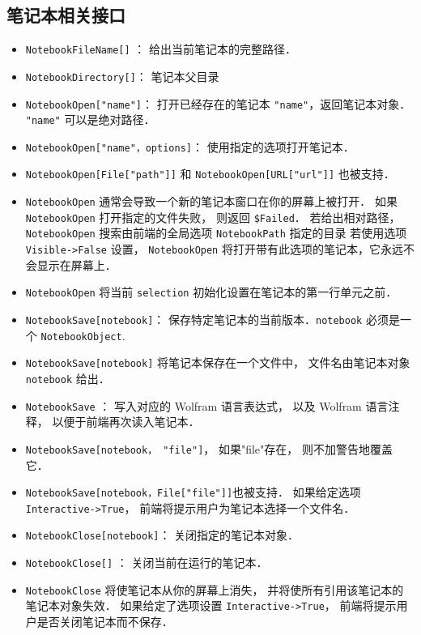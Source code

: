 \subsection{笔记本相关接口}

\begin{itemize}
\item \verb`NotebookFileName[]` ： 给出当前笔记本的完整路径．
\item \verb`NotebookDirectory[]`： 笔记本父目录
\end{itemize}


\begin{itemize}
\item \verb`NotebookOpen["name"]`：  打开已经存在的笔记本 \verb`"name"`，返回笔记本对象． \verb`"name"` 可以是绝对路径．
\item \verb`NotebookOpen["name"，options]`： 使用指定的选项打开笔记本．
\item \verb`NotebookOpen[File["path"]]` 和 \verb`NotebookOpen[URL["url"]]` 也被支持．
\item \verb`NotebookOpen` 通常会导致一个新的笔记本窗口在你的屏幕上被打开．
如果 \verb`NotebookOpen` 打开指定的文件失败， 则返回 \verb`$Failed`．
若给出相对路径， \verb`NotebookOpen` 搜索由前端的全局选项 \verb`NotebookPath` 指定的目录
若使用选项 \verb`Visible->False` 设置， \verb`NotebookOpen` 将打开带有此选项的笔记本，它永远不会显示在屏幕上．
\item \verb`NotebookOpen` 将当前 \verb`selection` 初始化设置在笔记本的第一行单元之前．
\end{itemize}


\begin{itemize}
\item \verb`NotebookSave[notebook]`： 保存特定笔记本的当前版本．\verb`notebook` 必须是一个 \verb`NotebookObject`.
\item \verb`NotebookSave[notebook]` 将笔记本保存在一个文件中， 文件名由笔记本对象 \verb`notebook` 给出．
\item \verb`NotebookSave` ： 写入对应的 Wolfram 语言表达式， 以及 Wolfram 语言注释， 以便于前端再次读入笔记本．
\item \verb`NotebookSave[notebook， "file"]`， 如果"file"存在， 则不加警告地覆盖它．
\item \verb`NotebookSave[notebook，File["file"]]`也被支持．
如果给定选项 \verb`Interactive->True`， 前端将提示用户为笔记本选择一个文件名．
\item \verb`NotebookClose[notebook]`： 关闭指定的笔记本对象．
\item \verb`NotebookClose[]` ： 关闭当前在运行的笔记本．
\item \verb`NotebookClose` 将使笔记本从你的屏幕上消失， 并将使所有引用该笔记本的笔记本对象失效．
如果给定了选项设置 \verb`Interactive->True`， 前端将提示用户是否关闭笔记本而不保存．
\end{itemize}




